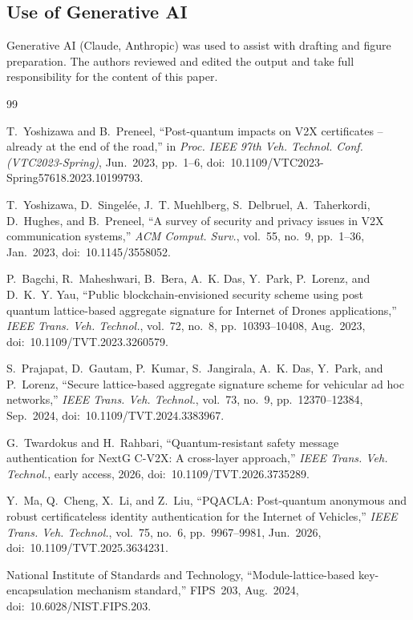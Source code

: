 \documentclass[journal,twoside]{IEEEtran}
\begin{document}
\subsection*{Use of Generative AI}
Generative AI (Claude, Anthropic) was used to assist with drafting and figure preparation. The authors reviewed and edited the output and take full responsibility for the content of this paper.

\begin{thebibliography}{99}

T.~Yoshizawa and B.~Preneel, ``Post-quantum impacts on {V2X} certificates -- already at the end of the road,'' in \emph{Proc. IEEE 97th Veh. Technol. Conf. (VTC2023-Spring)}, Jun.~2023, pp.~1--6, doi:~10.1109/VTC2023-Spring57618.2023.10199793.

T.~Yoshizawa, D.~Singel{\'e}e, J.~T. Muehlberg, S.~Delbruel, A.~Taherkordi, D.~Hughes, and B.~Preneel, ``A survey of security and privacy issues in {V2X} communication systems,'' \emph{ACM Comput. Surv.}, vol.~55, no.~9, pp.~1--36, Jan.~2023, doi:~10.1145/3558052.

P.~Bagchi, R.~Maheshwari, B.~Bera, A.~K. Das, Y.~Park, P.~Lorenz, and D.~K.~Y. Yau, ``Public blockchain-envisioned security scheme using post quantum lattice-based aggregate signature for {Internet of Drones} applications,'' \emph{IEEE Trans. Veh. Technol.}, vol.~72, no.~8, pp.~10393--10408, Aug.~2023, doi:~10.1109/TVT.2023.3260579.

S.~Prajapat, D.~Gautam, P.~Kumar, S.~Jangirala, A.~K. Das, Y.~Park, and P.~Lorenz, ``Secure lattice-based aggregate signature scheme for vehicular ad hoc networks,'' \emph{IEEE Trans. Veh. Technol.}, vol.~73, no.~9, pp.~12370--12384, Sep.~2024, doi:~10.1109/TVT.2024.3383967.

G.~Twardokus and H.~Rahbari, ``Quantum-resistant safety message authentication for {NextG C-V2X}: A cross-layer approach,'' \emph{IEEE Trans. Veh. Technol.}, early access, 2026, doi:~10.1109/TVT.2026.3735289.

Y.~Ma, Q.~Cheng, X.~Li, and Z.~Liu, ``{PQACLA}: Post-quantum anonymous and robust certificateless identity authentication for the {Internet of Vehicles},'' \emph{IEEE Trans. Veh. Technol.}, vol.~75, no.~6, pp.~9967--9981, Jun.~2026, doi:~10.1109/TVT.2025.3634231.

National Institute of Standards and Technology, ``Module-lattice-based key-encapsulation mechanism standard,'' FIPS~203, Aug.~2024, doi:~10.6028/NIST.FIPS.203.


\end{thebibliography}
\end{document}
